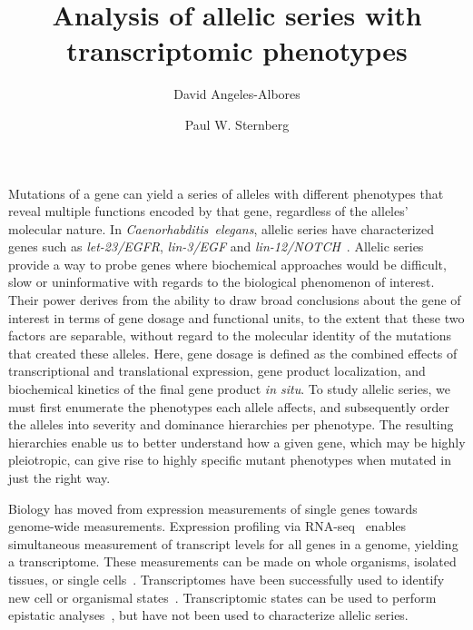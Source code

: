 \documentclass[9pt,twocolumn,twoside]{gsajnl}
\title{Analysis of allelic series with transcriptomic phenotypes}
\author[$\dagger$]{David Angeles-Albores}
\author[$\dagger$,1]{Paul W. Sternberg}
\affil[$\dagger$]{Division of Biology and Biological Engineering, Caltech,
Pasadena, CA, 91125, USA}
\newcommand{\gene}[1]{\mbox{\emph{#1}}}
\begin{document}
\maketitle{}
\thispagestyle{firststyle}
\marginmark{}
\firstpagefootnote{}
\vspace{-11pt}%

\linenumbers{}
\lettrine[lines=2]{\color{color2}M}{}utations of a gene can yield a series of
alleles with different phenotypes that reveal multiple functions encoded by that
gene, regardless of the alleles' molecular nature. In
\emph{Caenorhabditis~elegans}, allelic series have characterized genes such as
\gene{let-23/EGFR}, \gene{lin-3/EGF} and \gene{lin-12/NOTCH}~\citep{Aroian1991,
Ferguson1985a, Greenwald1983}. Allelic series provide a way to probe
genes where biochemical approaches would be difficult, slow or uninformative
with regards to the biological phenomenon of interest. Their power derives from
the ability to draw broad conclusions about the gene of interest in terms of
gene dosage and functional units, to the extent that these two factors are
separable, without regard to the molecular identity of the mutations that
created these alleles. Here, gene dosage is defined as the combined effects of
transcriptional and translational expression, gene product localization, and
biochemical kinetics of the final gene product \emph{in situ}. To study allelic
series, we must first enumerate the phenotypes each allele affects, and
subsequently order the alleles into severity and dominance hierarchies per
phenotype. The resulting hierarchies enable us to better understand how a given
gene, which may be highly pleiotropic, can give rise to highly specific mutant
phenotypes when mutated in just the right way.

Biology has moved from expression measurements of single genes towards
genome-wide measurements. Expression profiling via RNA-seq~\citep{Mortazavi2008}
enables simultaneous measurement of transcript levels for all genes in a genome,
yielding a transcriptome. These measurements can be made on whole organisms,
isolated tissues, or single cells~\citep{Tang2009,Schwarz2012}. Transcriptomes
have been successfully used to identify new cell or organismal
states~\citep{Angeles-Albores2017,Villani2017}. Transcriptomic states can be
used to perform epistatic analyses~\citep{Dixit2016,AngelesAlboresHIF},
but have not been used to characterize allelic series.
\end{document}
